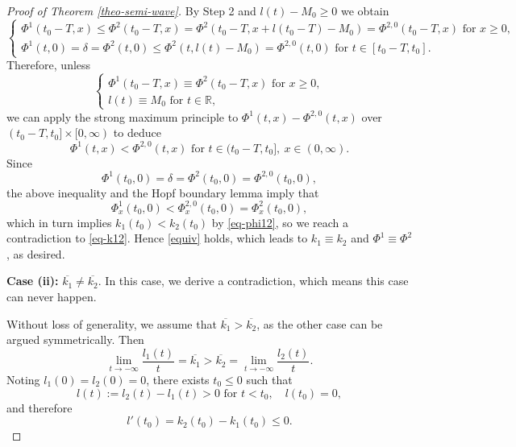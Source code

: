 \documentclass[11pt]{amsart}
\numberwithin{equation}{section}
\begin{document}
\begin{proof}[Proof of Theorem \ref{theo-semi-wave}]
By Step 2 and $l(t)-M_0\geq 0$  we obtain 
\begin{equation*}\begin{cases}
  \Phi^1(t_0-T,x)\leq \Phi^2(t_0-T,x)=\Phi^2(t_0-T, x+l(t_0-T)-M_0)=\Phi^{2,0}(t_0-T,x) \text{ for } x\geq 0,\\
  \Phi^1(t,0)=\delta=\Phi^2(t,0)\leq \Phi^2(t,l(t)-M_0)=\Phi^{2,0}(t,0) \text{ for }t\in[t_0-T,t_0].
  \end{cases}
\end{equation*}
Therefore, unless 
\begin{equation}\label{equiv}
 \begin{cases} \Phi^1(t_0-T,x)\equiv \Phi^2(t_0-T,x) \text{ for } x\geq 0,\\
 l(t)\equiv M_0 \mbox{ for } t\in\mathbb R,
 \end{cases}
\end{equation}
we can apply the strong maximum principle to $\Phi^1(t,x)-\Phi^{2,0}(t,x)$ over $(t_0-T,t_0]\times[0,\infty)$ to deduce
\begin{equation*}
  \Phi^1(t,x)< \Phi^{2,0}(t,x) \text{ for }t\in(t_0-T,t_0],\ x\in(0,\infty).
\end{equation*}
Since  
\begin{equation*}
 \Phi^1(t_0,0)=\delta=\Phi^2(t_0,0)=\Phi^{2,0}(t_0,0), 
\end{equation*}
the above inequality and the Hopf boundary lemma imply that 
\begin{equation*}
  \Phi^1_x(t_0,0)<\Phi^{2,0}_x(t_0,0)=\Phi^2_x(t_0,0),
\end{equation*}
which in turn implies $k_1(t_0)<k_2(t_0)$ by \eqref{eq-phi12}, so we reach a contradiction to \eqref{eq-k12}. Hence \eqref{equiv} holds, which leads to  $k_1\equiv k_2$ and $\Phi^1\equiv \Phi^2$, as desired.

 
\textbf{Case (ii):} $\overline{k_1} \neq \overline{k_2}$. In this case, we derive a contradiction, which means  this case can never happen.

Without loss of generality, we assume that $\overline{k_1}>\overline{k_2}$, as the other  case can be argued symmetrically. Then 
\begin{equation*}
    \lim_{t\to-\infty}\frac{l_1(t)}{t}=\overline{k_1}>\overline{k_2} =\lim_{t\to-\infty}\frac{l_2(t)}{t}.
\end{equation*}
Noting  $l_1(0)=l_2(0)=0$, there exists $t_0\leq 0$ such that 
\begin{equation*}
l(t):=l_2(t)-l_1(t)>0 \text{ for }t<t_0,  \quad   l(t_0)=0,   
\end{equation*}
and therefore
\begin{equation}\label{eq-k122}
  l'(t_0)=k_2(t_0)-k_1(t_0)\leq 0.
\end{equation}


\end{proof}
\end{document}

